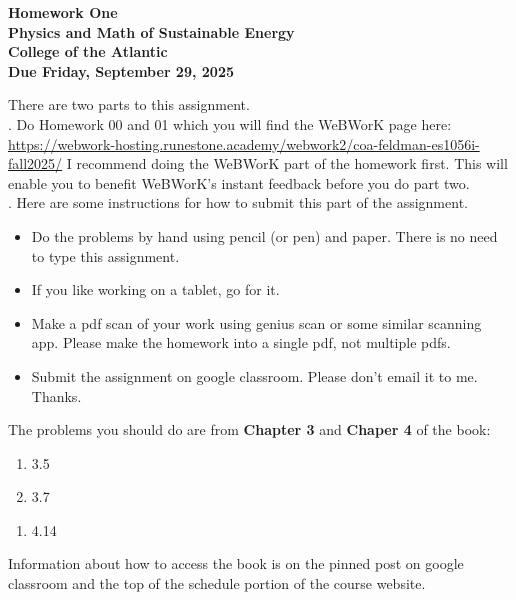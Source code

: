 \documentclass[12pt]{article}
\begin{document}
\pagestyle{empty}
 
\begin{center}
{\LARGE {\bf Homework One}}\\
\bigskip
{\Large {\bf Physics and Math of Sustainable Energy}}\\
\bigskip
{\Large {\bf College of the Atlantic}}\\
\bigskip
{ {\bf Due Friday, September 29, 2025}}\\ 
\end{center}
\medskip


\noindent There are two parts to this assignment.\\

.  Do Homework 00 and 01 which you
will find the WeBWorK page here:
\url{https://webwork-hosting.runestone.academy/webwork2/coa-feldman-es1056i-fall2025/}
I recommend doing the WeBWorK part of the homework first. This will
enable you to benefit WeBWorK's instant feedback before you do part
two.\\ 


.  Here are some
instructions for how to submit this part of the assignment.
\begin{itemize}
\item Do the problems by hand using pencil (or pen) and paper.
  There is no need to type this assignment.
\item If you like working on a tablet, go for it. 
\item Make a pdf scan of your work using genius scan or some
  similar scanning app. Please make the homework into a single
  pdf, not multiple pdfs.
\item Submit the assignment on google classroom.  Please don't
  email it to me. Thanks.\\
\end{itemize}

\noindent The problems you should do are from {\bf Chapter 3} and {\bf
  Chaper 4} of the book:  

\begin{enumerate}
\setlength{\itemsep}{-1mm}
  \item 3.5
  \item 3.7\\
\end{enumerate}

\begin{enumerate}
  \setlength{\itemsep}{-1mm}
  \item 4.14
\end{enumerate}

\noindent Information about how to access the book is on the
pinned post on google classroom and the top of the schedule portion of
the course website.  
\end{document}
